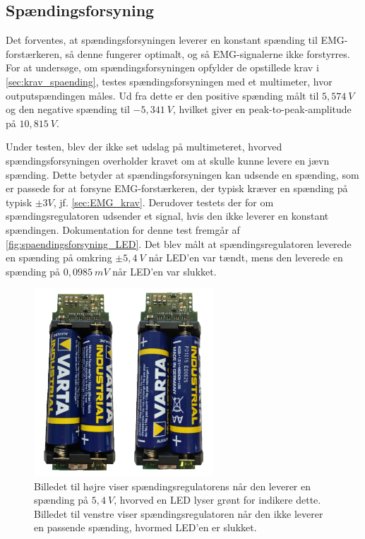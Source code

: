 \subsection{Spændingsforsyning} \label{test_spaendingsforsyning}
Det forventes, at spændingsforsyningen leverer en konstant spænding til EMG-forstærkeren, så denne fungerer optimalt, og så EMG-signalerne ikke forstyrres. For at undersøge, om spændingsforsyningen opfylder de opstillede krav i \ref{sec:krav_spaending}, testes spændingsforsyningen med et multimeter, hvor outputspændingen måles. %
Ud fra dette er den positive spænding målt til $5,574~V$ og den negative spænding til $-5,341~V$, hvilket giver en peak-to-peak-amplitude på $10,815~V$.

Under testen, blev der ikke set udslag på multimeteret, hvorved spændingsforsyningen overholder kravet om at skulle kunne levere en jævn spænding. Dette betyder at spændingsforsyningen kan udsende en spænding, som er passede for at forsyne EMG-forstærkeren, der typisk kræver en spænding på typisk $\pm3V$, jf. \autoref{sec:EMG_krav}. 
Derudover testets der for om spændingsregulatoren udsender et signal, hvis den ikke leverer en konstant spændingen. Dokumentation for denne test fremgår  af \autoref{fig:spaendingsforsyning_LED}. Det blev målt at spændingsregulatoren leverede en spænding på omkring $\pm5,4~V$ når LED'en var tændt, mens den leverede en spænding på $0,0985~mV$ når LED'en var slukket.


\begin{figure}[H]
\centering
\includegraphics[width=0.6\textwidth]{figures/bat_test}
\caption{Billedet til højre viser spændingsregulatorens når den leverer en spænding på $5,4~V$, hvorved en LED lyser grønt for indikere dette. Billedet til venstre viser spændingsregulatoren når den ikke leverer en passende spænding, hvormed LED'en er slukket.}
\label{fig:spaendingsforsyning_LED}
\end{figure}


